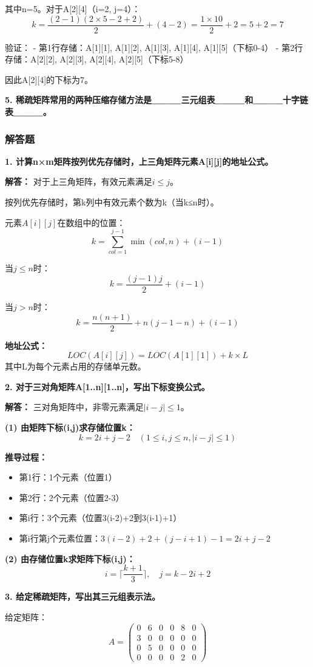 \documentclass[12pt,a4paper]{amsart}
\begin{document}
其中n=5。对于A[2][4]（i=2, j=4）：
$$k = \frac{(2-1)(2 \times 5 - 2 + 2)}{2} + (4-2) = \frac{1 \times 10}{2} + 2 = 5 + 2 = 7$$

验证：
- 第1行存储：A[1][1], A[1][2], A[1][3], A[1][4], A[1][5]（下标0-4）
- 第2行存储：A[2][2], A[2][3], A[2][4], A[2][5]（下标5-8）

因此A[2][4]的下标为7。

\textbf{5. 稀疏矩阵常用的两种压缩存储方法是\_\_\_\_三元组表\_\_\_\_和\_\_\_\_十字链表\_\_\_\_。}

\subsubsection{解答题}

\textbf{1. 计算n×m矩阵按列优先存储时，上三角矩阵元素A[i][j]的地址公式。}

\textbf{解答：}
对于上三角矩阵，有效元素满足$i \leq j$。

按列优先存储时，第k列中有效元素个数为k（当k≤n时）。

元素$A[i][j]$在数组中的位置：
$$k = \sum_{col=1}^{j-1}\min(col,n) + (i-1)$$

当$j \leq n$时：
$$k = \frac{(j-1)j}{2} + (i-1)$$

当$j > n$时：
$$k = \frac{n(n+1)}{2} + n(j-1-n) + (i-1)$$

\textbf{地址公式：}
$$LOC(A[i][j]) = LOC(A[1][1]) + k \times L$$
其中L为每个元素占用的存储单元数。

\textbf{2. 对于三对角矩阵A[1..n][1..n]，写出下标变换公式。}

\textbf{解答：}
三对角矩阵中，非零元素满足$|i-j| \leq 1$。

\textbf{(1) 由矩阵下标(i,j)求存储位置k：}
$$k = 2i + j - 2 \quad (1 \leq i,j \leq n, |i-j| \leq 1)$$

\textbf{推导过程：}
\begin{itemize}
\item 第1行：1个元素（位置1）
\item 第2行：2个元素（位置2-3）
\item 第i行：3个元素（位置3(i-2)+2到3(i-1)+1）
\item 第i行第j个元素位置：$3(i-2) + 2 + (j-i+1) - 1 = 2i + j - 2$
\end{itemize}

\textbf{(2) 由存储位置k求矩阵下标(i,j)：}
$$i = \lceil \frac{k+1}{3} \rceil, \quad j = k - 2i + 2$$

\textbf{3. 给定稀疏矩阵，写出其三元组表示法。}

给定矩阵：
$$A = \begin{pmatrix}
0 & 6 & 0 & 0 & 8 & 0 \\
3 & 0 & 0 & 0 & 0 & 0 \\
0 & 5 & 0 & 0 & 0 & 0 \\
0 & 0 & 0 & 0 & 2 & 0
\end{pmatrix}$$
\end{document}

